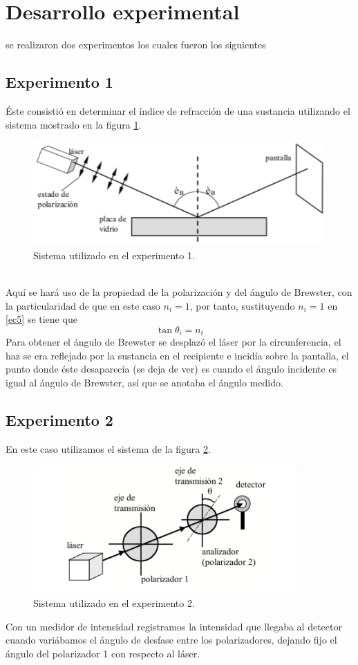 \documentclass[13,twocolumn,letterpaper]{article}
\begin{document}
\section*{Desarrollo experimental} 
se realizaron dos experimentos los cuales fueron los siguientes
\subsection*{Experimento 1 }
Éste consistió en determinar el índice de refracción de una sustancia utilizando el  sistema mostrado en la figura \ref{fig:fig2}.
\begin{figure}[h!]
	\centering
	\includegraphics[width=0.7\linewidth]{fig2}
	\caption[Figura 1]{Sistema utilizado en el experimento 1.}
	\label{fig:fig2}
\end{figure}
\\Aquí se hará uso de la propiedad de la polarización y del ángulo de Brewster, con la particularidad de que en este caso $n_{i}=1$, por tanto, sustituyendo $n_{i}=1$ en \ref{ec5} se tiene que
\begin{equation}\label{ec13}
	\tan\theta_{i}=n_{t}
\end{equation}
Para obtener el ángulo de Brewster se desplazó el láser por la circunferencia, el
haz se era reflejado por la sustancia en el recipiente e incidía sobre la pantalla, el
punto donde éste desaparecía (se deja de ver) es cuando el ángulo incidente es
igual al ángulo de Brewster, así que se anotaba el ángulo medido.
\subsection*{Experimento 2}
En este caso utilizamos el  sistema de la figura \ref{fig:fig3}.
\begin{figure}[h!]
	\centering
	\includegraphics[width=0.7\linewidth]{fig3}
	\caption[Figura 1]{Sistema utilizado en el experimento 2.}
	\label{fig:fig3}
\end{figure}
Con un medidor de intensidad registramos la intensidad que llegaba al detector
cuando variábamos el ángulo de desfase entre los polarizadores, dejando fijo el
ángulo del polarizador 1 con respecto al láser.
\end{document}
